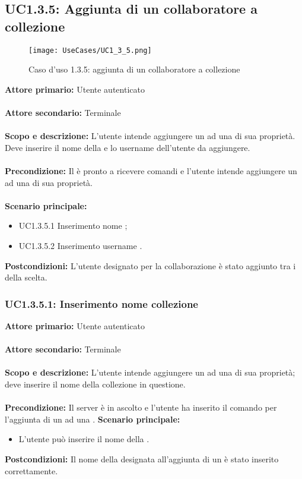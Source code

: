 \documentclass{scalatekids-article}
\begin{document}
\subsection{UC1.3.5: Aggiunta di un collaboratore a collezione}

\begin{figure}[H]
  \begin{center}
    \texttt{[image: UseCases/UC1\_3\_5.png]}
    \caption*{Caso d'uso 1.3.5: aggiunta di un collaboratore a collezione}
  \end{center}
\end{figure}
\textbf{Attore primario:} Utente autenticato\\ \\
\textbf{Attore secondario:} Terminale\\ \\
\textbf{Scopo e descrizione:} L'utente intende aggiungere un  ad una  di sua proprietà. Deve inserire il nome della  e lo username dell'utente da aggiungere.\\ \\
\textbf{Precondizione:} Il  è pronto a ricevere comandi e l'utente intende aggiungere un  ad una  di sua proprietà.\\ \\
\textbf{Scenario principale:}
\begin{itemize}
  \item UC1.3.5.1 Inserimento nome ;
  \item UC1.3.5.2 Inserimento username .
\end{itemize}
\textbf{Postcondizioni:} L'utente designato per la collaborazione è stato aggiunto tra i  della  scelta.

\subsubsection{UC1.3.5.1: Inserimento nome collezione}

\textbf{Attore primario:} Utente autenticato\\ \\
\textbf{Attore secondario:} Terminale\\ \\
\textbf{Scopo e descrizione:} L'utente intende aggiungere un  ad una  di sua proprietà; deve inserire il nome della collezione in questione.\\ \\
\textbf{Precondizione:} Il server è in ascolto e l'utente ha inserito il comando per l'aggiunta di un  ad una .
\textbf{Scenario principale:}
\begin{itemize}
  \item L'utente può inserire il nome della .
\end{itemize}
\textbf{Postcondizioni:} Il nome della  designata all'aggiunta di un  è stato inserito correttamente.
\end{document}
